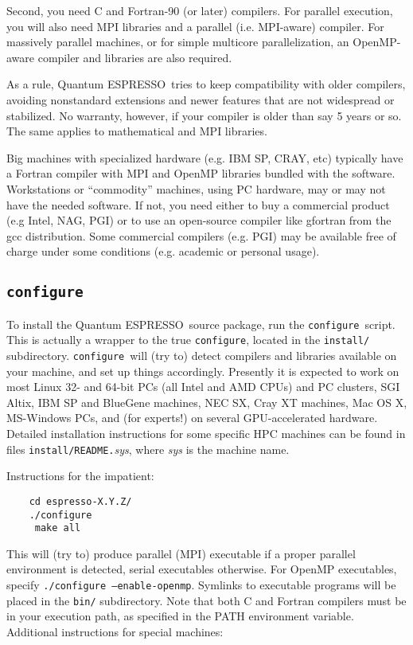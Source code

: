 \documentclass[12pt,a4paper]{article}
\def\qe{{\sc Quantum ESPRESSO}}
\def\configure{\texttt{configure}}
\begin{document}
Second, you need C and Fortran-90 (or later) compilers. For parallel
execution, you will also need MPI libraries and a parallel
(i.e. MPI-aware) compiler. For massively parallel machines, or
for simple multicore parallelization, an OpenMP-aware compiler
and libraries are also required.

As a rule, \qe\ tries to keep compatibility with older compilers,
avoiding nonstandard extensions and newer features that
are not widespread or stabilized. No warranty, however, if
your compiler is older than say 5 years or so. The same applies to
mathematical and MPI libraries.

Big machines with
specialized hardware (e.g. IBM SP, CRAY, etc) typically have a
Fortran compiler with MPI and OpenMP libraries bundled with
the software. Workstations or ``commodity'' machines, using PC
hardware, may or may not have the needed software. If not, you need
either to buy a commercial product (e.g Intel, NAG, PGI) or to
use an open-source compiler like gfortran from the gcc distribution.
Some commercial compilers (e.g. PGI) may be available free of charge 
under some conditions (e.g. academic or personal usage).

\subsection{\configure}

To install the \qe\ source package, run the \configure{}ript. This is actually a wrapper to the true \configure,
located in the \texttt{install/} subdirectory. \configure\
will (try to) detect compilers and libraries available on
your machine, and set up things accordingly. Presently it is expected
to work on most Linux 32- and 64-bit PCs (all Intel and AMD CPUs) and
PC clusters, SGI Altix, IBM SP and BlueGene machines, NEC SX, Cray XT
machines, Mac OS X, MS-Windows PCs, and (for experts!) on several
GPU-accelerated hardware. Detailed installation instructions for some
specific HPC machines can be found in files \texttt{install/README.}{\em sys},
where {\em sys} is the machine name.

Instructions for the impatient:
\begin{verbatim}
    cd espresso-X.Y.Z/
    ./configure
     make all
\end{verbatim}
This will (try to) produce parallel (MPI) executable if a proper parallel
environment is detected, serial executables otherwise. For OpenMP executables,
specify \texttt{./configure --enable-openmp}. Symlinks to executable programs
will be placed in the \texttt{bin/}
subdirectory. Note that both C and Fortran compilers must be in your execution
path, as specified in the PATH environment variable.
Additional instructions for special machines:
\end{document}
